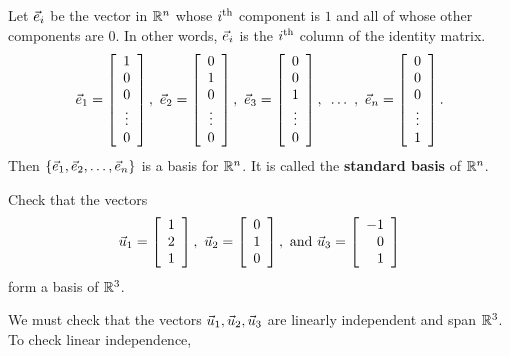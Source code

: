 \documentclass{ximera}
\begin{document}
\begin{exploration}

\begin{example}
  Let $\vect{e}_i$ be the vector in $\R^n$ whose $i\th$ component is $1$
  and all of whose other components are $0$. In other words, $\vect{e}_i$
  is the $i\th$ column of the identity matrix.
  \begin{equation*}
    \vect{e}_1 = \startmat{c} 1 \\ 0 \\ 0 \\ \vdots \\ 0 \stopmat,\quad
    \vect{e}_2 = \startmat{c} 0 \\ 1 \\ 0 \\ \vdots \\ 0 \stopmat,\quad
    \vect{e}_3 = \startmat{c} 0 \\ 0 \\ 1 \\ \vdots \\ 0 \stopmat,\quad
    \ldots~,\quad
    \vect{e}_n = \startmat{c} 0 \\ 0 \\ 0 \\ \vdots \\ 1\stopmat.
  \end{equation*}
  Then $\set{\vect{e}_1,\vect{e}_2,\ldots,\vect{e}_n}$ is a basis for
  $\R^n$. It is called the \textbf{standard basis}%
  of\/ $\R^n$.
\end{example}

\begin{example}
  Check that the vectors
  \begin{equation*}
    \vect{u}_1 = \startmat{r} 1 \\ 2 \\ 1 \stopmat,\quad
    \vect{u}_2 = \startmat{r} 0 \\ 1 \\ 0 \stopmat,\quad
    \mbox{and}\quad
    \vect{u}_3 = \startmat{r} -1 \\ 0 \\ 1 \stopmat
  \end{equation*}
  form a basis of\/ $\R^3$.
\end{example}

\begin{solution}
  We must check that the vectors $\vect{u}_1,\vect{u}_2,\vect{u}_3$
  are linearly independent and span $\R^3$. To check linear
  independence, 



\end{solution}
\end{exploration}
\end{document}
